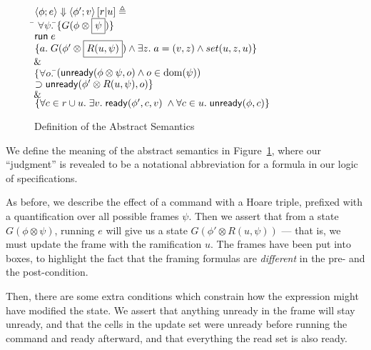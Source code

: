 \begin{figure}
\begin{tabbing}
$\left<{\phi};{e}\right>\Downarrow\left<{\phi'};{v}\right>\left[{r}|{u}\right] \triangleq$ \\[0.5em]
\;\;\= $\forall \psi.\;$\=$\{{G(\phi \otimes \boxed{\psi})}\}$ \\
    \>                  \>${\mathsf{run}\; e}$ \\
    \>                  \>$\{{a.\;
                             G(\phi' \otimes \boxed{R(u, \psi)})
                             \land \exists z.\; a = (v, z) \land set(u, z, u)}\}$ \\
    \>                  \>$\!\!\;\&\;$ \\
    \>                  \>$\{\forall o.\;$\=$(\mathsf{unready}({\phi \otimes \psi}, {o}) \land o \in \mbox{dom}({\psi}))$ \\
    \>                  \> \> $\supset \mathsf{unready}({\phi' \otimes R(u, \psi)}, {o})\}$ \\
\>$\!\!\;\&\;$ \\ 
\>$\{\forall c \in r \cup u.\; \exists v.\; \mathsf{ready}({\phi'}, {c}, {v}) \;\land \forall c \in u.\; \mathsf{unready}({\phi}, {c})\}$ 
\end{tabbing}
\caption{Definition of the Abstract Semantics}
\label{abstract-semantics}
\end{figure}

We define the meaning of the abstract semantics in
Figure~\ref{abstract-semantics}, where our ``judgment'' is revealed to 
be a notational abbreviation for a formula in our logic of specifications.

As before, we describe the effect of a command with a Hoare triple,
prefixed with a quantification over all possible frames $\psi$. Then
we assert that from a state $G(\phi \otimes \psi)$, running $e$ will
give us a state $G(\phi' \otimes R(u, \psi))$ --- that is, we must
update the frame with the ramification $u$. The frames have been put
into boxes, to highlight the fact that the framing formulas are
\emph{different} in the pre- and the post-condition.

Then, there are some extra conditions which constrain how the
expression might have modified the state. We assert that anything
unready in the frame will stay unready, and that the cells in the
update set were unready before running the command and ready afterward,
and that everything the read set is also ready. 

